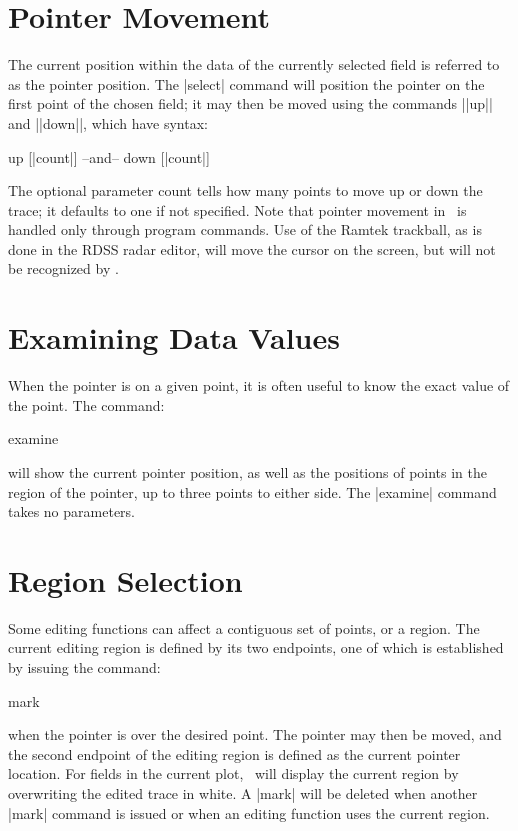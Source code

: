 \section{Pointer Movement}
The current position within the data of the currently selected field is 
referred to as the pointer position.  The |select| command will position the 
pointer on the first point of the chosen field; it may then be moved using 
the commands ||up|| and ||down||, which have syntax:
\begin{example}
	up [|count|]
	  {\rm --and--}
	down [|count|]
\end{example}
The optional parameter {\pf count} tells how many points to move up or
down the trace; it defaults to one if not specified.  Note that pointer
movement in \suds\ is handled only through program commands.  Use of the
Ramtek trackball, as is done in the RDSS radar editor, will move the cursor on
the screen, but will not be recognized by \suds.

\section{Examining Data Values}
When the pointer is on a given point, it is often useful to know the exact
value of the point.  The command:
\begin{example}
	examine
\end{example}
will show the current pointer position, as well as the positions of points  
in the region of the pointer, up to three points to either side.
The |examine| command takes no parameters.

\section{Region Selection}
Some editing functions can affect a contiguous set of points, or a region.
The current editing region is defined by its two endpoints, one of which is 
established by issuing the command:
\begin{example}
	mark
\end{example}
when the pointer is over the desired point.  The pointer may then be moved,
and the second endpoint of the editing region is defined as the current 
pointer location.  For fields in the current plot, \suds\ will display the 
current region by overwriting the edited trace in white.  A |mark| will be 
deleted when another |mark| command is issued or when an editing function uses 
the current region.

